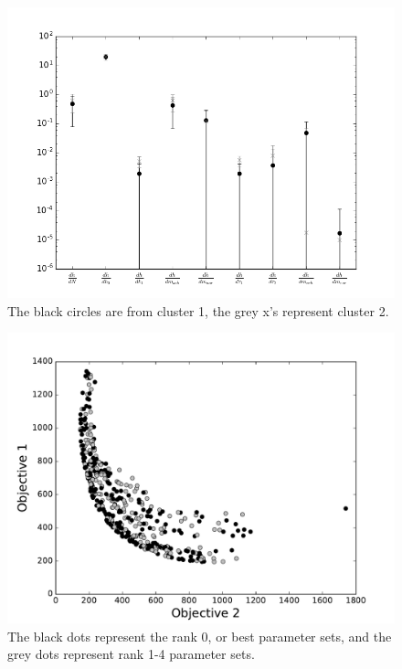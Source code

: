 \documentclass[fleqn,10pt]{wlscirep}
\begin{document}
\begin{figure}[ht]
       \centering
       \includegraphics[width=\linewidth]{figures/MultiobjectiveSenstivityGraph}
       \caption{The black circles are from cluster 1, the grey x's represent cluster 2.}
        \label{fig:MultiobjectiveSensitivityGraph}
\end{figure} 
\begin{figure}[ht]
       \centering
       \includegraphics[width=\linewidth]{figures/TradeOffCurveFasterCooling}
       \caption{The black dots represent the rank 0, or best parameter sets, and the grey dots represent rank 1-4 parameter sets.}
       \label{fig:tradeoffcurve}
\end{figure}
\end{document}
